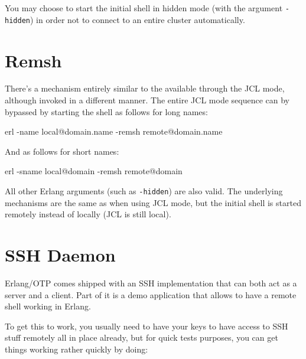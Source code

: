 \documentclass[11pt, oneside]{book}   	%
\newcommand{\command}[1]{\Verb`#1`}
\begin{document}
You may choose to start the initial shell in hidden mode (with the argument \command{-hidden}) in order not to connect to an entire cluster automatically.

\section{Remsh}

There's a mechanism entirely similar to the available through the JCL mode, although invoked in a different manner. The entire JCL mode sequence can by bypassed by starting the shell as follows for long names:

\begin{VerbatimText}
erl -name local@domain.name -remsh remote@domain.name
\end{VerbatimText}

And as follows for short names:

\begin{VerbatimText}
erl -sname local@domain -remsh remote@domain
\end{VerbatimText}

All other Erlang arguments (such as \command{-hidden}) are also valid. The underlying mechanisms are the same as when using JCL mode, but the initial shell is started remotely instead of locally (JCL is still local).

\section{SSH Daemon}

Erlang/OTP comes shipped with an SSH implementation that can both act as a server and a client. Part of it is a demo application that allows to have a remote shell working in Erlang.

To get this to work, you usually need to have your keys to have access to SSH stuff remotely all in place already, but for quick tests purposes, you can get things working rather quickly by doing:

\end{document}
